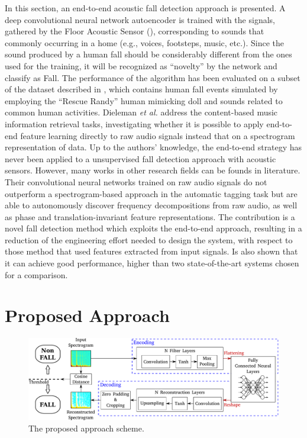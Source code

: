 In this section, an end-to-end acoustic fall detection approach is presented. A deep convolutional neural network autoencoder is trained with the signals, gathered by the Floor Acoustic Sensor (), corresponding to sounds that commonly occurring in a home (e.g., voices, footsteps, music, etc.). Since the sound produced by a human fall should be considerably different from the ones used for the training, it will be recognized as ``novelty'' by the network and classify as Fall. 
The performance of the algorithm has been evaluated on a subset of the dataset described in , which contains human fall events simulated by employing the “Rescue Randy” human mimicking doll \cite{Werner2011,zigel2009method,alwan2006smart} and sounds related to common human activities.
Dieleman \textit{et al.} \cite{dieleman2014end} address the content-based music information retrieval tasks, investigating whether it is possible to apply end-to-end feature learning directly to raw audio signals instead that on a spectrogram representation of data.   
Up to the authors' knowledge, the end-to-end strategy has never been applied to a unsupervised fall detection approach with acoustic sensors. However, many works in other research fields can be founds in literature. 
Their convolutional neural networks trained on raw audio signals do not outperform a spectrogram-based approach in the automatic tagging task but are able to autonomously discover frequency decompositions from raw audio, as well as phase and translation-invariant feature representations.
The contribution is a novel fall detection method which exploits the end-to-end approach, resulting in a reduction of the engineering effort needed to design the system, with respect to those method that used features extracted from input signals. Is also shown that it can achieve good performance, higher than two state-of-the-art systems chosen for a comparison.


\section{Proposed Approach}
\label{sec:proposedApproach}

\begin{figure}[t]
	\centering
	\includegraphics[width=\columnwidth]{img/wirn2017/approccioComplessivo.pdf}
	\caption{The proposed approach scheme.}\label{fig:overall}
\end{figure}

